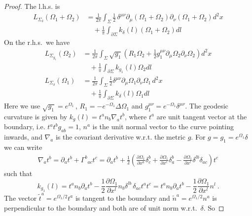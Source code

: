 \documentclass[11pt,a4paper]{article}
\numberwithin{equation}{section}
\begin{document}
\begin{proof}
The l.h.s. is 
%
\begin{align}
    L_{\Sigma_\delta}(\Omega_1 + \Omega_2) &= \frac{1}{2\pi} \int_\Sigma \frac{1}{2}\,\delta^{\mu\nu} \partial_\mu (\Omega_1+\Omega_2)\partial_\nu (\Omega_1+\Omega_2) d^2x 
    \nonumber
    \\
    &\quad+ \frac{1}{\pi}\int_{\partial\Sigma} k_\delta(l) (\Omega_1+\Omega_2) dl
\end{align}
%
On the r.h.s.\ we have
%
\begin{align}
    L_{\Sigma_{g_1}}(\Omega_2) &= \frac{1}{2\pi} \int_\Sigma \sqrt{g_1} \left(R_1\Omega_2 +\frac{1}{2} g_1^{\mu\nu} \partial_\mu \Omega_2\partial_\nu\Omega_2\right) d^2x
    \nonumber
    \\
    &\quad+\frac{1}{\pi} \int_{\partial\Sigma} k_{g_1}(l) \Omega_2 dl
    \nonumber
    \\
    L_{\Sigma_{\delta}}(\Omega_1) &=\frac{1}{2\pi} \int_\Sigma \frac{1}{2} \delta^{\mu\nu} \partial_\mu \Omega_1\partial_\nu\Omega_1 \,d^2x
    \nonumber
    \\
    &\quad+\frac{1}{\pi} \int_{\partial\Sigma} k_{\delta}(l) \Omega_1 dl
\end{align}
%
Here we use $\sqrt{g_1} = e^{\Omega_1}$\,, $R_1 = -e^{-\Omega_1}\Delta\Omega_1$ and $g_1^{\mu\nu} = e^{-\Omega_1}\delta^{\mu\nu}$. The geodesic curvature is given by $k_{g}(l) = t^a n_b \nabla_a t^b$, where $t^a$ are unit tangent vector at the boundary, i.e. $t^a t^b g_{ab} = 1$, $n^a$ is the unit normal vector to the curve pointing inwards, and $\nabla_a$ is the covariant derivative w.r.t. the metric $g$. For $g = g_1 = e^{\Omega_1}\delta$ we can write 
%
\begin{align}
    \nabla_a t^b = \partial_a t^b + {\Gamma^b}_{ac}t^c = \partial_a t^b +\frac{1}{2}\left(\frac{\partial\Omega_1}{\partial x^a} \delta^b_c + \frac{\partial\Omega_1}{\partial x^c} \delta^b_a - \frac{\partial\Omega_1}{\partial x^l} \delta^{lb}\delta_{ac} \right)t^c
\end{align}
%
such that
%
\begin{equation}
    k_{g_1}(l) = t^a n_b \partial_a t^b -\frac{1}{2} \frac{\partial \Omega_1}{\partial x^l} n_b \delta^{lb}\, \delta_{ac} t^at^c = t^a n_b \partial_a t^b -\frac{1}{2} \frac{\partial \Omega_1}{\partial x^l} n^l
    \ .
\end{equation}
%
The vector $\tilde{t}^a = e^{\Omega_1/2} t^a$ is tangent to the boundary and $\tilde{n}^a = e^{\Omega_1/2}n^a$ is perpendicular to the boundary and both are of unit norm w.r.t.\ $\delta$. So

\end{proof}
\end{document}

